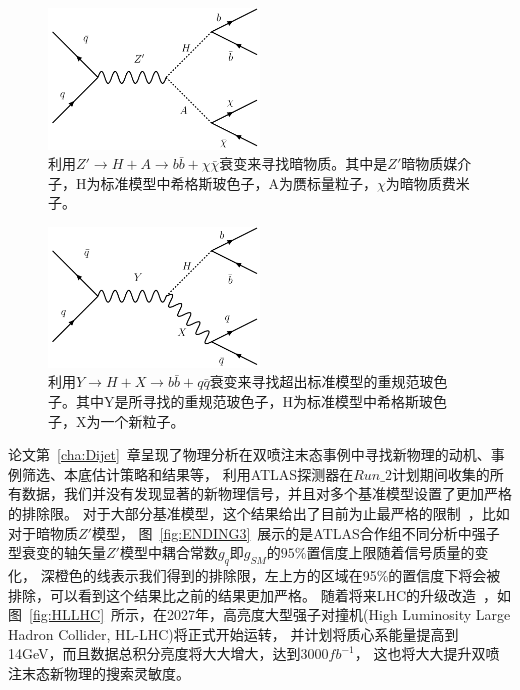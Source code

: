 \begin{figure}
  \begin{center}
    \includegraphics[width=0.5\textwidth]{figuresEND/DMZHA.pdf}
  \end{center}
  \caption{
利用$Z' \to H+A\to b\bar{b}+\chi\bar{\chi}$衰变来寻找暗物质。其中是$Z'$暗物质媒介子，H为标准模型中希格斯玻色子，A为赝标量粒子，$\chi$为暗物质费米子。
  }
    \label{fig:ENDING1}
\end{figure}

\begin{figure}
  \begin{center}
    \includegraphics[width=0.5\textwidth]{figuresEND/YXH.pdf}
  \end{center}
  \caption{
利用$Y\to H+X\to b\bar{b}+q\bar{q}$衰变来寻找超出标准模型的重规范玻色子。其中Y是所寻找的重规范玻色子，H为标准模型中希格斯玻色子，X为一个新粒子。
  }
    \label{fig:ENDING2}
\end{figure}

论文第~\ref{cha:Dijet}~章呈现了物理分析在双喷注末态事例中寻找新物理的动机、事例筛选、本底估计策略和结果等，
利用ATLAS探测器在$Run\_2$计划期间收集的所有数据，我们并没有发现显著的新物理信号，并且对多个基准模型设置了更加严格的排除限。
对于大部分基准模型，这个结果给出了目前为止最严格的限制~\cite{DIJETSUM}，比如对于暗物质$Z'$模型，
图~\ref{fig:ENDING3}~展示的是ATLAS合作组不同分析中强子型衰变的轴矢量$Z'$模型中耦合常数$g_q$即$g_{SM}$的$95\%$置信度上限随着信号质量的变化，
深橙色的线表示我们得到的排除限，左上方的区域在95\%的置信度下将会被排除，可以看到这个结果比之前的结果更加严格。
随着将来LHC的升级改造~\cite{HLLHC}，如图~\ref{fig:HLLHC}~所示，在2027年，高亮度大型强子对撞机(High Luminosity Large Hadron Collider, HL-LHC)将正式开始运转，
并计划将质心系能量提高到14GeV，而且数据总积分亮度将大大增大，达到3000$fb^{-1}$，
这也将大大提升双喷注末态新物理的搜索灵敏度。



